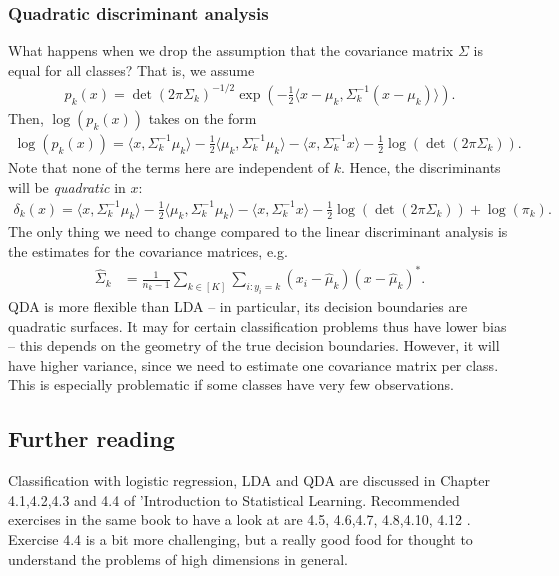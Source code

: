 \documentclass{article}
\newcommand{\sprod}[1]{\langle #1 \rangle}
\begin{document}
\subsubsection{Quadratic discriminant analysis} What happens when we drop the assumption that the covariance matrix $\Sigma$ is equal for all classes? That is, we assume 
\begin{align*}
    p_k(x) = \det(2\pi\Sigma_k)^{-1/2} \exp( -\tfrac{1}{2}\sprod{x-\mu_k,\Sigma_k^{-1}(x-\mu_k)}).
\end{align*}
Then, $\log(p_k(x))$ takes on the form
\begin{align*}
    \log(p_k(x)) =  \sprod{x,\Sigma_k^{-1}\mu_k} -\tfrac{1}{2}\sprod{\mu_k,\Sigma_k^{-1}\mu_k}-\sprod{x,\Sigma_k^{-1}x}- \tfrac{1}{2}\log(\det(2\pi\Sigma_k)).
\end{align*}
Note that none of the terms here are independent of $k$. Hence, the discriminants will be \emph{quadratic} in $x$:
\begin{align*}
     \delta_k(x) = \sprod{x,\Sigma_k^{-1}\mu_k} -\tfrac{1}{2}\sprod{\mu_k,\Sigma_k^{-1}\mu_k}-\sprod{x,\Sigma_k^{-1}x}- \tfrac{1}{2}\log(\det(2\pi\Sigma_k)) +\log(\pi_k).
\end{align*}
The only thing we need to change compared to the linear discriminant analysis is the estimates for the covariance matrices, e.g.
\begin{align*}
     \widehat{\Sigma}_k &= \frac{1}{n_k-1}\sum_{k\in [K]} \sum_{i : y_i =k}(x_i-\hat{\mu}_k)(x-\hat{\mu}_k)^*.
\end{align*}
QDA is more flexible than LDA -- in particular, its decision boundaries are quadratic surfaces. It may for certain classification problems thus have lower bias -- this depends on the geometry of the true decision boundaries. However, it will have higher variance, since we need to estimate one covariance matrix per class. This is especially problematic if some classes have very few observations.

\subsection{Further reading}
Classification with logistic regression, LDA and QDA are discussed in Chapter 4.1,4.2,4.3 and 4.4 of 'Introduction to Statistical Learning. Recommended exercises in the same book to have a look at are 4.5, 4.6,4.7, 4.8,4.10, 4.12 . Exercise 4.4 is a bit more challenging, but a really good food for thought to understand the problems of high dimensions in general.
\end{document}
